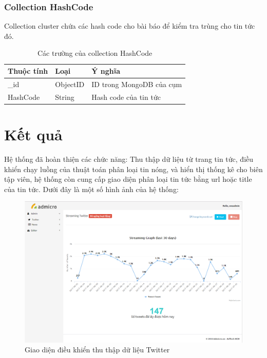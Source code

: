		\subsubsection{Collection HashCode}
		Collection cluster chứa các hash code cho bài báo để kiểm tra trùng cho tin tức đó.
		\begin{table}[H]
			\setlength\extrarowheight{3pt}
			\begin{tabular}{|l|l|p{9cm}|}
				\hline
				\textbf{Thuộc tính}     & \textbf{Loại} & \textbf{Ý nghĩa} \\\hline
				\_id           & ObjectID       &  ID trong MongoDB của cụm\\\hline
				HashCode      & String           & Hash code của tin tức\\\hline
			\end{tabular}%
			\caption{Các trường của collection HashCode}
			\label{tab:table_3_3}%
		\end{table}%
\section{Kết quả}
Hệ thống đã hoàn thiện các chức năng: Thu thập dữ liệu từ trang tin tức, điều khiển chạy luồng của thuật toán phân loại tin nóng, và hiển thị thống kê cho biên tập viên, hệ thống còn cung cấp giao diện phân loại tin tức bằng url hoặc title của tin tức. Dưới đây là một số hình ảnh của hệ thống:

\begin{figure}[H]
	\centering
	\includegraphics[width=1\linewidth]{Chapter3/Chapter3Figs/StreamingNonwide}
	\caption{Giao diện điều khiển thu thập dữ liệu Twitter}
	\label{fig:streaming}
\end{figure}

